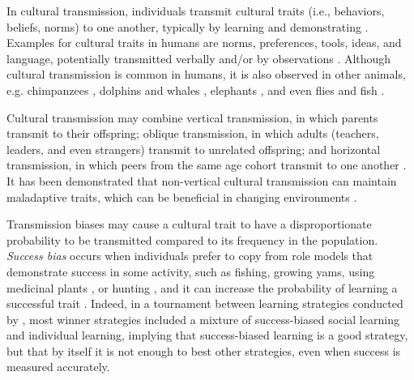 \documentclass[12pt]{extarticle}
\begin{document}
In cultural transmission, individuals transmit cultural traits (i.e., behaviors, beliefs, norms) to one another, typically by learning and demonstrating \citep{transmissionVectorsBook}.
Examples for cultural traits in humans are norms, preferences, tools, ideas, and language, potentially transmitted verbally and/or by observations \citep{transmissionVectors}. 
Although cultural transmission is common in humans, it is also observed in other animals, e.g. chimpanzees \citep{chimpsPrestige, chimpsCopy}, dolphins and whales \citep{dolphins_whales}, elephants \citep{elepahntsRepo}, and even flies \citep{fliesPaper} and fish \citep{Truskanov2020}.

Cultural transmission may combine vertical transmission, in which parents transmit to their offspring; oblique transmission, in which adults (teachers, leaders, and even strangers) transmit to unrelated offspring; and horizontal transmission, in which peers from the same age cohort transmit to one another \citep{transmissionVectorsBook,transmissionVectors}.
It has been demonstrated that non-vertical cultural transmission can maintain maladaptive traits, which can be beneficial in changing environments \citep{changeEnv}. 

Transmission biases may cause a cultural trait to have a disproportionate probability to be transmitted compared to its frequency in the population. \textit{Success bias} occurs when individuals prefer to copy from role models that demonstrate success in some activity, such as fishing, growing yams, using medicinal plants \citep{fijian_social_bias}, or hunting \citep{Mesoudi2008}, and it can increase the probability of learning a successful trait \citep{Borofsky2022}. 
Indeed, in a tournament between learning strategies conducted by \citet{strategiesPaper}, most winner strategies included a mixture of success-biased social learning and individual learning, implying that success-biased learning is a good strategy, but that by itself it is not enough to best other strategies, even when success is measured accurately.
\end{document}
